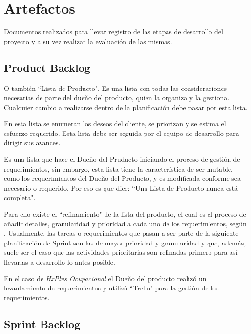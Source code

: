     \section{Artefactos}
    
    Documentos realizados para llevar registro de las etapas de desarrollo del proyecto y a su vez realizar la evaluación de las mismas.
    
        \subsection{Product Backlog}
        
        O también ``Lista de Producto". Es una lista con todas las consideraciones necesarias de parte del dueño del producto, quien la organiza y la gestiona. Cualquier cambio a realizarse dentro de la planificación debe pasar por esta lista.
        
        En esta lista se enumeran los deseos del cliente, se priorizan y se estima el esfuerzo requerido. Esta lista debe ser seguida por el equipo de desarrollo para dirigir sus avances.
        
        Es una lista que hace el Dueño del Pruducto iniciando el proceso de gestión de requerimientos, sin embargo, esta lista tiene la característica de ser mutable, como los requerimientos del Dueño del Producto, y es modificada conforme sea necesario o requerido. Por eso es que \citeauthor{scrum-guia}\cite{scrum-guia} dice: ``Una Lista de Producto nunca está completa".
        
        Para ello existe el ``refinamiento" de la lista del  producto, el cual  es el proceso de añadir detalles, granularidad y prioridad a cada uno de los requerimientos, según \citeauthor{scrum-guia}\cite{scrum-guia}. Usualmente, las tareas o requerimientos que pasan a ser parte de la siguiente planificación de Sprint son las de mayor prioridad y granularidad y que, además, suele ser el caso que las actividades prioritarias son refinadas primero para así llevarlas a desarrollo lo antes posible.
        
        En el caso de \textit{HxPlus Ocupacional} el Dueño del producto realizó un levantamiento de requerimientos y utilizó ``Trello" para la gestión de los requerimientos.
    
        \subsection{Sprint Backlog}
        
